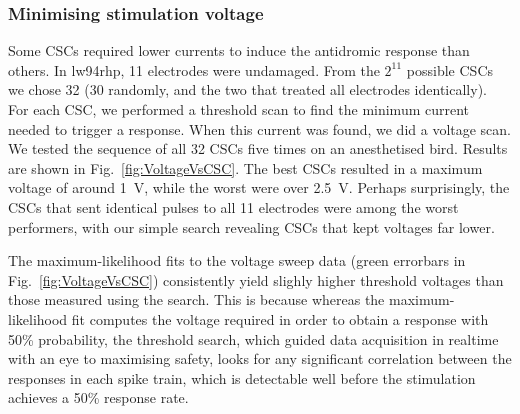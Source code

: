 \documentclass[10pt,letterpaper]{article}
\newcommand\fig[1]{Fig.~\ref{#1}}
\newcommand{\noprint}[1]{}
\begin{document}
\subsubsection{Minimising stimulation voltage}

Some CSCs required lower currents to induce the antidromic response
than others. In lw94rhp, 11 electrodes were undamaged. From the
$2^{11}$ possible CSCs we chose 32 (30 randomly, and the two that
treated all electrodes identically).  For each CSC, we performed a
threshold scan to find the minimum current needed to trigger a
response.  When this current was found, we did a voltage scan.  We
tested the sequence of all 32 CSCs five times on an anesthetised bird.  Results are shown
in \fig{fig:VoltageVsCSC}.  The best CSCs resulted in a maximum
voltage of around 1~V, while the worst were over 2.5~V.  Perhaps
surprisingly, the CSCs that sent identical pulses to all 11 electrodes
were among the worst performers, with our simple search revealing CSCs
that kept voltages far lower.

The maximum-likelihood fits to the voltage sweep data (green errorbars
in \fig{fig:VoltageVsCSC}) consistently yield slighly higher threshold
voltages than those measured using the search.  This is because
whereas the maximum-likelihood fit computes the voltage required in
order to obtain a response with 50\% probability, the threshold
search, which guided data acquisition in realtime with an eye to maximising safety, looks for any
significant correlation between the responses in each spike train,
which is detectable well before the stimulation achieves a 50\%
response rate.

\noprint{FIXME: The following caveat doesn't apply to
  lw95rhp-2015-12-04: Each threshold scan terminated when a
  stimulation voltage over 3 V was detected, so for some datasets
  (e.g. lw95rhp-2015-12-09) we were unable to acquire all five
  measurements for some CSCs, and thus they are worse than the figure
  shows.}
\end{document}
